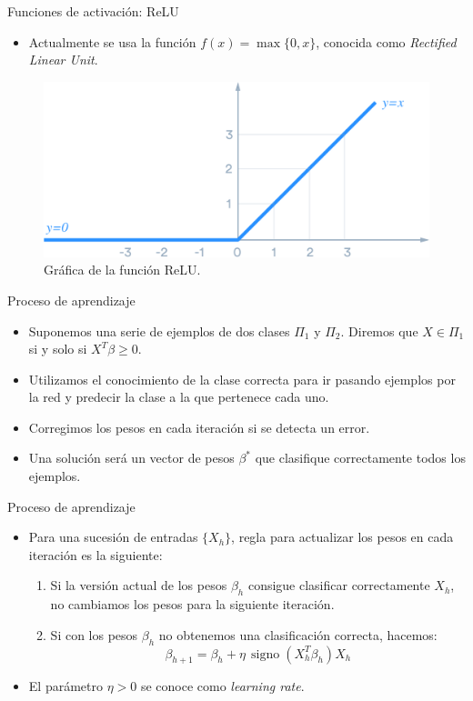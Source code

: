 \documentclass[spanish]{beamer}
\begin{document}
\begin{frame}{Funciones de activación: ReLU}
  \begin{itemize}
    \item Actualmente se usa la función $f(x) = \max \{0, x\}$, conocida como \textit{Rectified Linear Unit}.
  \end{itemize}

    \begin{figure}[h]
    \centering
    \includegraphics[width=.75\textwidth]{img/relu}
    \caption{Gráfica de la función ReLU.}
  \end{figure}

\end{frame}

\begin{frame}{Proceso de aprendizaje}
\begin{itemize}
\item Suponemos una serie de ejemplos de dos clases $\Pi_1$ y $\Pi_2$. Diremos que $X \in \Pi_1$ si y solo si $X^T\beta \ge 0$.
\item Utilizamos el conocimiento de la clase correcta para ir pasando ejemplos por la red y predecir la clase a la que pertenece cada uno.
\item Corregimos los pesos en cada iteración si se detecta un error.
\item Una solución será un vector de pesos $\beta^\ast$ que clasifique correctamente todos los ejemplos.
\end{itemize}
\end{frame}

\begin{frame}{Proceso de aprendizaje}
\begin{itemize}
\item Para una sucesión de entradas $\{X_h\}$, regla para actualizar los pesos en cada iteración es la siguiente:
  \begin{enumerate}
    \item Si la versión actual de los pesos $\beta_h$ consigue clasificar correctamente $X_h$, no cambiamos los pesos para la siguiente iteración.
    \item Si con los pesos $\beta_h$ no obtenemos una clasificación correcta, hacemos:
    $$\beta_{h+1} = \beta_h + \eta \, \operatorname{signo}(X^{T}_{h} \beta_h)X_h $$
  \end{enumerate}
  \item El parámetro $\eta > 0$ se conoce como \textit{learning rate}.
\end{itemize}
\end{frame}
\end{document}
